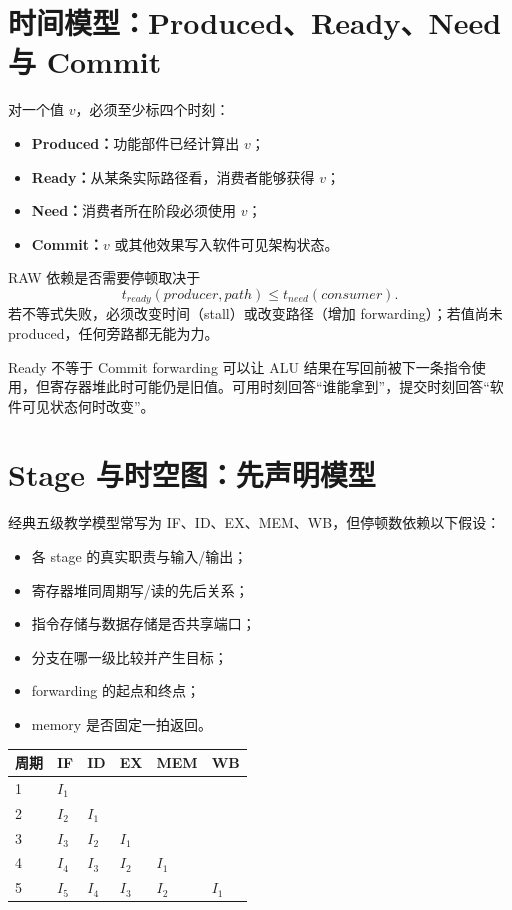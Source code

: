 \documentclass[UTF8,fontset=fandol,11pt,a4paper]{ctexart}
\newcommand{\kw}[1]{\textbf{\color{deep}#1}}
\begin{document}
\section{时间模型：Produced、Ready、Need 与 Commit}

对一个值 $v$，必须至少标四个时刻：
\begin{itemize}
  \item \kw{Produced：}功能部件已经计算出 $v$；
  \item \kw{Ready：}从某条实际路径看，消费者能够获得 $v$；
  \item \kw{Need：}消费者所在阶段必须使用 $v$；
  \item \kw{Commit：}$v$ 或其他效果写入软件可见架构状态。
\end{itemize}

RAW 依赖是否需要停顿取决于
\[
t_{ready}(producer,path)\le t_{need}(consumer).
\]
若不等式失败，必须改变时间（stall）或改变路径（增加 forwarding）；若值尚未 produced，任何旁路都无能为力。

\begin{warnbox}{Ready 不等于 Commit}
forwarding 可以让 ALU 结果在写回前被下一条指令使用，但寄存器堆此时可能仍是旧值。可用时刻回答“谁能拿到”，提交时刻回答“软件可见状态何时改变”。
\end{warnbox}

\section{Stage 与时空图：先声明模型}

经典五级教学模型常写为 IF、ID、EX、MEM、WB，但停顿数依赖以下假设：
\begin{itemize}
  \item 各 stage 的真实职责与输入/输出；
  \item 寄存器堆同周期写/读的先后关系；
  \item 指令存储与数据存储是否共享端口；
  \item 分支在哪一级比较并产生目标；
  \item forwarding 的起点和终点；
  \item memory 是否固定一拍返回。
\end{itemize}

\begin{center}
\small
\begin{tabularx}{\linewidth}{C{1.5cm}YYYYY}
\toprule
周期 & IF & ID & EX & MEM & WB\\
 & $I_1$ & & & &\\
2 & $I_2$ & $I_1$ & & &\\
3 & $I_3$ & $I_2$ & $I_1$ & &\\
4 & $I_4$ & $I_3$ & $I_2$ & $I_1$ &\\
5 & $I_5$ & $I_4$ & $I_3$ & $I_2$ & $I_1$\\
\bottomrule
\end{tabularx}
\end{center}
\end{document}
